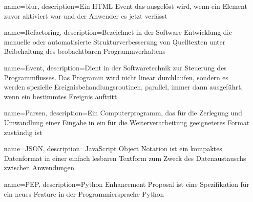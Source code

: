 {
    name=blur,
    description={Ein HTML Event das ausgelöst wird, wenn ein Element zuvor aktiviert war und der Anwender es jetzt verlässt}
}

{
    name=Refactoring,
    description={Bezeichnet in der Software-Entwicklung die manuelle oder automatisierte Strukturverbesserung von Quelltexten unter Beibehaltung des beobachtbaren Programmverhaltens}
}

{
    name=Event,
    description={Dient in der Softwaretechnik zur Steuerung des Programmflusses. Das Programm wird nicht linear durchlaufen, sondern es werden spezielle Ereignisbehandlungsroutinen, parallel, immer dann ausgeführt, wenn ein bestimmtes Ereignis auftritt}
}

{
    name=Parsen,
    description={Ein Computerprogramm, das für die Zerlegung und Umwandlung einer Eingabe in ein für die Weiterverarbeitung geeigneteres Format zuständig ist}
}

{
    name=JSON,
    description={JavaScript Object Notation ist ein kompaktes Datenformat in einer einfach lesbaren Textform zum Zweck des Datenaustauschs zwischen Anwendungen}
}

{
    name=PEP,
    description={Python Enhancement Proposal ist eine Spezifikation für ein neues Feature in der Programmiersprache Python}
}

